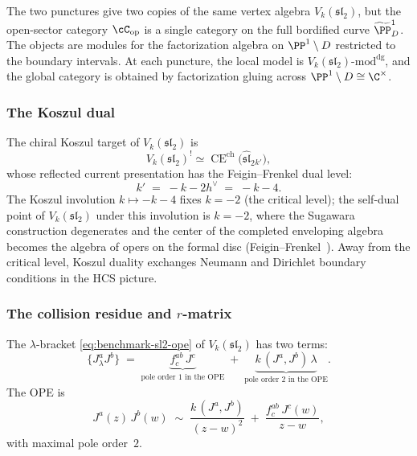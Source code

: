 \begin{remark}
\label{rem:benchmark-two-copies}
The two punctures give two copies of the same vertex algebra
$V_k(\mathfrak{sl}_2)$, but the open-sector category
$\cC_{\mathrm{op}}$ is a single category on the full bordified
curve $\widetilde{\PP}^1_D$. The objects are modules for the
factorization algebra on $\PP^1 \setminus D$ restricted to
the boundary intervals. At each puncture, the local model is
$V_k(\mathfrak{sl}_2)\text{-mod}^{\mathrm{dg}}$, and the global
category is obtained by factorization gluing across
$\PP^1 \setminus D \cong \C^\times$.
\end{remark}


\subsubsection{The Koszul dual}
\label{subsubsec:benchmark-koszul-dual}

The chiral Koszul target of $V_k(\mathfrak{sl}_2)$ is
\[
V_k(\mathfrak{sl}_2)^!
\simeq
\operatorname{CE}^{\mathrm{ch}}\!\bigl(
  \widehat{\mathfrak{sl}}_2{}_{k'}\bigr),
\]
whose reflected current presentation has the Feigin--Frenkel dual level:
\begin{equation}\label{eq:benchmark-koszul-dual-level}
 k'
 \;=\;
 -k - 2h^\vee
 \;=\;
 -k - 4.
\end{equation}
The Koszul involution $k \mapsto -k-4$ fixes $k = -2$
(the critical level); the self-dual point of
$V_k(\mathfrak{sl}_2)$ under this involution is $k = -2$, where
the Sugawara construction degenerates and the center of the
completed enveloping algebra becomes the algebra of opers on the
formal disc (Feigin--Frenkel~\cite{FBZ04}). Away from
the critical level, Koszul duality exchanges Neumann and Dirichlet
boundary conditions in the HCS picture.


\subsubsection{The collision residue and $r$-matrix}
\label{subsubsec:benchmark-r-matrix}

The $\lambda$-bracket
\eqref{eq:benchmark-sl2-ope}
of $V_k(\mathfrak{sl}_2)$ has two terms:
\[
 \{J^a_\lambda J^b\}
 \;=\;
 \underbrace{f^{ab}_c\, J^c}_{\text{pole order }1
 \text{ in the OPE}}
 \;+\;
 \underbrace{k\,(J^a, J^b)\,\lambda}_{\text{pole order }2
 \text{ in the OPE}}.
\]
The OPE is
\begin{equation}\label{eq:benchmark-sl2-ope-explicit}
 J^a(z)\, J^b(w)
 \;\sim\;
 \frac{k\,(J^a, J^b)}{(z-w)^2}
 \;+\;
 \frac{f^{ab}_c\, J^c(w)}{z-w},
\end{equation}
with maximal pole order~$2$.

